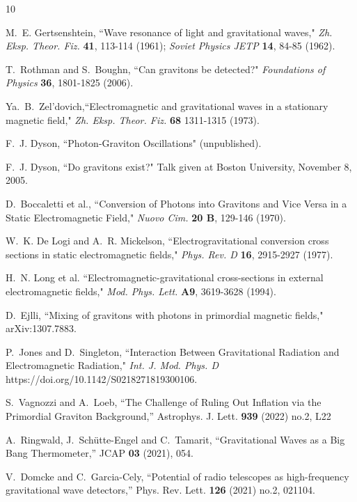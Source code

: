 \documentclass[12pt]{article}
\begin{document}
\newpage

{\small\begin{thebibliography}{10}

M.\ E. Gertsenshtein, ``Wave resonance of light and gravitational waves," {\it Zh. Eksp. Theor. Fiz.}  {\bf 41}, 113-114 (1961); {\it Soviet Physics JETP} {\bf 14}, 84-85 (1962).

T.\ Rothman and S.\ Boughn, ``Can gravitons be detected?" {\it Foundations of Physics} {\bf 36}, 1801-1825 (2006).

Ya.\ B.\ Zel'dovich,``Electromagnetic and gravitational waves in a stationary magnetic field," {\it Zh. Eksp. Theor. Fiz.} {\bf 68} 1311-1315 (1973).

F.\ J. Dyson, ``Photon-Graviton Oscillations" (unpublished).

F.\ J. Dyson, ``Do gravitons exist?" Talk given at Boston University, November 8, 2005.

D.\ Boccaletti et al., ``Conversion of Photons into Gravitons and Vice Versa in a Static Electromagnetic Field," {\it Nuovo Cim.} {\bf 20 B}, 129-146 (1970).

W.\ K. De Logi and A.\ R. Mickelson, ``Electrogravitational conversion cross sections in static electromagnetic fields," {\it Phys. Rev. D} {\bf 16}, 2915-2927 (1977).

H.\  N. Long et al. ``Electromagnetic-gravitational cross-sections in external electromagnetic fields," {\it Mod. Phys. Lett.} {\bf A9}, 3619-3628 (1994).

D.\ Ejlli, ``Mixing of gravitons with photons in primordial magnetic fields," arXiv:1307.7883.

P.\ Jones and D.\ Singleton, ``Interaction Between Gravitational Radiation and Electromagnetic Radiation," {\it Int. J. Mod. Phys. D} https://doi.org/10.1142/S0218271819300106.

S.~Vagnozzi and A.~Loeb,
``The Challenge of Ruling Out Inflation via the Primordial Graviton Background,''
Astrophys. J. Lett. \textbf{939} (2022) no.2, L22

A.~Ringwald, J.~Sch\"utte-Engel and C.~Tamarit,
``Gravitational Waves as a Big Bang Thermometer,''
JCAP \textbf{03} (2021), 054.

V.~Domcke and C.~Garcia-Cely,
``Potential of radio telescopes as high-frequency gravitational wave detectors,''
Phys. Rev. Lett. \textbf{126} (2021) no.2, 021104.


\end{thebibliography}}
\end{document}
